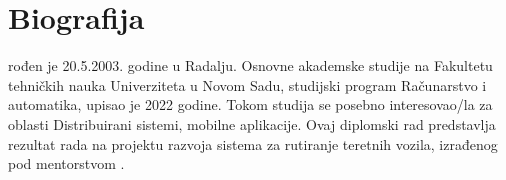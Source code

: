 \chapter*{Biografija}

\Autor{} rođen je 20.5.2003. godine u Radalju. Osnovne akademske studije na Fakultetu tehničkih nauka Univerziteta u Novom Sadu, studijski program Računarstvo i automatika, upisao je 2022 godine. Tokom studija se posebno interesovao/la za oblasti Distribuirani sistemi, mobilne aplikacije. Ovaj diplomski rad predstavlja rezultat rada na projektu razvoja sistema za rutiranje teretnih vozila, izrađenog pod mentorstvom \Mentor.

